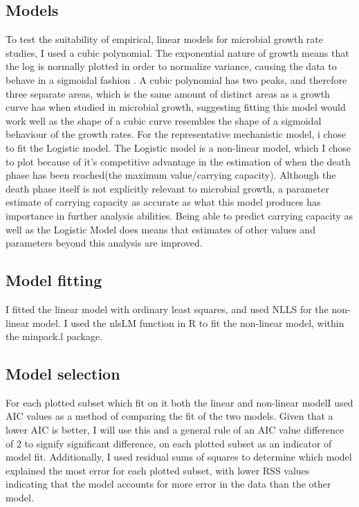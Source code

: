\documentclass[11pt, a4paper, titlepage]{article}
\begin{document}
    \subsection*{Models}
    To test the suitability of empirical, linear models for microbial growth rate studies, I used a cubic polynomial. The exponential nature of growth means that the log is normally plotted in order to normalize variance, causing the data to behave in a sigmoidal fashion \cite{zwietering1990modeling}. A cubic polynomial has two peaks, and therefore three separate areas, which is the same amount of distinct areas as a growth curve has when studied in microbial growth, suggesting fitting this model would work well as the shape of a cubic curve resembles the shape of a sigmoidal behaviour of the growth rates. For the representative mechanistic model, i chose to fit the Logistic model. The Logistic model is a non-linear model, which I chose to plot because of it's competitive advantage in the estimation of when the death phase has been reached(the maximum value/carrying capacity). Although the death phase itself is not explicitly relevant to microbial growth, a parameter estimate of carrying capacity as accurate as what this model produces has importance in further analysis abilities. Being able to predict carrying capacity as well as the Logistic Model does means that estimates of other values and parameters beyond this analysis are improved. 

    \subsection*{Model fitting}
    I fitted the linear model with ordinary least squares, and used NLLS for the non-linear model. I used the nlsLM function in R to fit the non-linear model, within the minpack.l package. 


    \subsection*{Model selection}
    For each plotted subset which fit on it both the linear and non-linear modelI used AIC values as a method of comparing the fit of the two models. Given that a lower AIC is better, I will use this and a general rule of an AIC value difference of 2 to signify significant difference, on each plotted subset as an indicator of model fit. Additionally, I used residual sums of squares to determine which model explained the most error for each plotted subset, with lower RSS values indicating that the model accounts for more error in the data than the other model.
    
\end{document}
